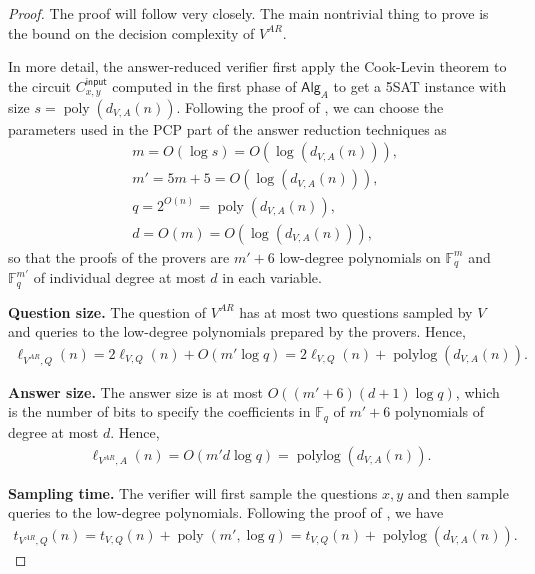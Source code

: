 \documentclass[10pt,a4paper]{article}
\theoremstyle{plain}
\theoremstyle{definition}
\newcommand{\poly} {\ensuremath{\operatorname{poly}}}
\newcommand{\polylog} {\ensuremath{\operatorname{polylog}}}
\newcommand{\1}{\mathbb{1}} %
\newcommand{\bF}{\mathbb{F}}
\newcommand{\ipt}{\mathsf{input}}
\newcommand{\Alg}{\mathsf{Alg}}
\begin{document}
\begin{proof}
    The proof will follow \cite{10.1145/3564246.3585208} very closely. The main nontrivial thing to prove is the bound on the decision complexity of $V^{AR}$. 
    
    In more detail, the answer-reduced verifier first apply the Cook-Levin theorem to the circuit $C^{\ipt}_{x,y}$ computed in the first phase of $\Alg_A$ to
    get a 5SAT instance with size $s = \poly(d_{V,A}(n))$.
    Following the proof of \cite[Theorem 51]{10.1145/3564246.3585208}, we can choose the parameters used in the PCP part of the answer reduction techniques as
    \begin{align*}
        &m = O(\log s) = O(\log(d_{V,A}(n))),\\
        &m' = 5m + 5 = O(\log(d_{V,A}(n))),\\
        &q = 2^{O(n)} = \poly(d_{V,A}(n)),\\
        &d = O(m) = O(\log(d_{V,A}(n))),
    \end{align*}
    so that the proofs of the provers are $m'+6$ low-degree polynomials on $\bF_q^m$ and $\bF_q^{m'}$ of individual degree at most $d$ in each variable.

    \textbf{Question size.} The question of $V^{AR}$ has at most two questions sampled by $V$ and queries to the low-degree polynomials prepared by the provers. Hence, 
    \begin{align*}
        \ell_{V^{AR},Q}(n) = 2 \ell_{V,Q}(n) + O(m' \log q) = 2 \ell_{V,Q}(n) + \polylog(d_{V,A}(n)).
    \end{align*}

    \textbf{Answer size.} The answer size is at most $O((m'+6)(d+1)\log q)$, which is the number of bits to specify the coefficients in $\bF_q$ of $m'+6$ polynomials of degree at most $d$. Hence,
    \begin{align*}
        \ell_{V^{AR},A}(n) = O(m'd \log q) = \polylog(d_{V,A}(n)).
    \end{align*}

    \textbf{Sampling time.} The verifier will first sample the questions $x,y$ and then sample queries to the low-degree polynomials. Following the proof of \cite[Theorem 10.27]{JNVWY'20}, we have
    \begin{align*}
        t_{V^{AR}, Q}(n) = t_{V,Q}(n) + \poly(m',\log q) = t_{V,Q}(n) + \polylog(d_{V,A}(n)).
    \end{align*}


\end{proof}
\end{document}
